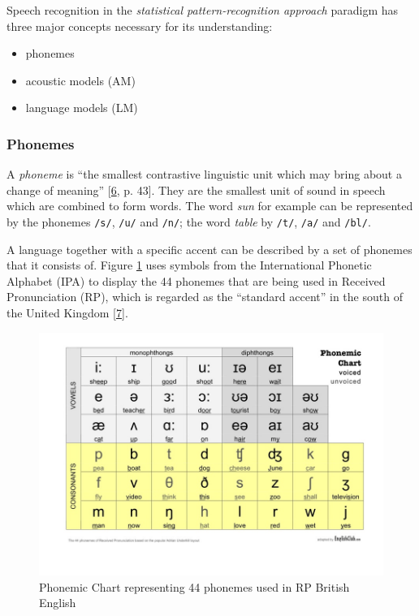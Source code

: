 \documentclass[]{article}
\providecommand{\tightlist}{%
  \setlength{\itemsep}{0pt}\setlength{\parskip}{0pt}}
\begin{document}
Speech recognition in the \emph{statistical pattern-recognition
approach} paradigm has three major concepts necessary for its
understanding:

\begin{itemize}
\tightlist
\item
  phonemes
\item
  acoustic models (AM)
\item
  language models (LM)
\end{itemize}

\subsubsection{Phonemes}\label{phonemes}

A \emph{phoneme} is ``the smallest contrastive linguistic unit which may
bring about a change of meaning''
{[}\hyperref[ref-cruttenden2014gimson]{6}, p. 43{]}. They are the
smallest unit of sound in speech which are combined to form words. The
word \emph{sun} for example can be represented by the phonemes
\texttt{/s/}, \texttt{/u/} and \texttt{/n/}; the word \emph{table} by
\texttt{/t/}, \texttt{/a/} and \texttt{/bl/}.

A language together with a specific accent can be described by a set of
phonemes that it consists of. Figure \ref{phonemic-chart} uses symbols
from the International Phonetic Alphabet (IPA) to display the 44
phonemes that are being used in Received Pronunciation (RP), which is
regarded as the ``standard accent'' in the south of the United Kingdom
{[}\hyperref[ref-stevenson2011concise]{7}{]}.

\begin{figure}[htbp]
\centering
\includegraphics{images/phonemes_50.jpg}
\caption{Phonemic Chart representing 44 phonemes used in RP British
English\label{phonemic-chart}}
\end{figure}
\end{document}
